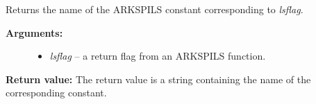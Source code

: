 \documentclass[letterpaper,10pt,english]{sphinxmanual}
\begin{document}
\begin{fulllineitems}
\label{c_interface/User_callable:ARKSpilsGetReturnFlagName}
Returns the name of the ARKSPILS constant
corresponding to \emph{lsflag}.
\begin{description}
\item[{\textbf{Arguments:}}] \leavevmode\begin{itemize}
\item {} 
\emph{lsflag} -- a return flag from an ARKSPILS function.

\end{itemize}

\end{description}

\textbf{Return value:}
The return value is a string containing the name of
the corresponding constant.

\end{fulllineitems}

\end{document}
